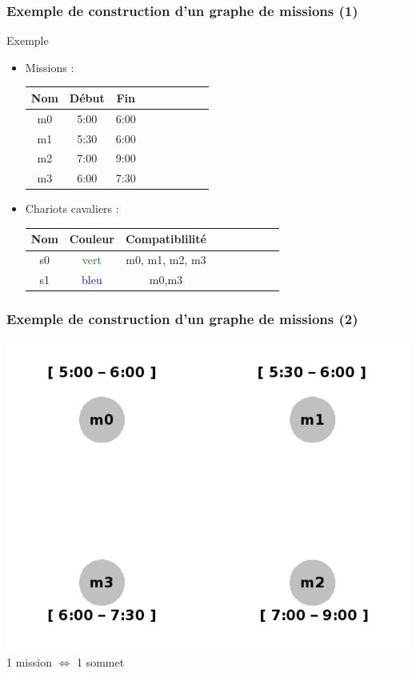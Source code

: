 \documentclass{beamer}
\begin{document}
\begin{frame}
 \frametitle{Exemple de construction d'un graphe de missions (1)}
	\begin{exampleblock}{Exemple}
		\begin{itemize}
		 \item Missions : \\
		\begin{center}
			\begin{tabular}{*{3}{|c|c|c}}
	 	 		\hline
		 		Nom	&	Début	&	Fin\\
				\hline
				m0	&	5:00	&	6:00 \\
				m1	&	5:30	&	6:00 \\
				m2	&	7:00	&	9:00 \\
				m3	&	6:00	&	7:30 \\
				\hline
	 		\end{tabular}
		\end{center}
		\item Chariots cavaliers : \\
		\begin{center}
			\begin{tabular}{*{3}{|c|c|c}}
	 	 		\hline
		 		Nom	&	Couleur	& Compatiblilité\\
				\hline
				s0	&	\textcolor{green}{vert}	& m0, m1, m2, m3\\
				s1	&	\textcolor{blue}{bleu}	& m0,m3\\	
				\hline
	 		\end{tabular}
		\end{center}
		
		\end{itemize}

	\end{exampleblock}
	

	
\end{frame}
\begin{frame}
	\frametitle{Exemple de construction d'un graphe de missions (2)}
	\begin{center}
		\includegraphics[height=.50\textheight]{fig/only_vertices.png} \\
	
		1 mission $\Longleftrightarrow$ 1 sommet
	\end{center}
	
\end{frame}
\end{document}
